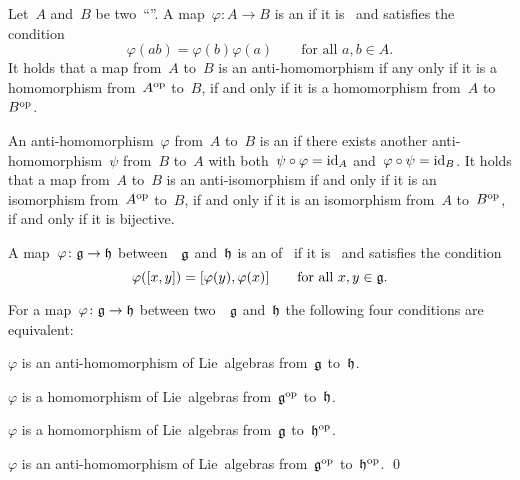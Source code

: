 \begin{recall}
  Let~$A$ and~$B$ be two~\enquote{\algebras{$\kf$}}.
  A map~$\varphi \colon A \to B$ is an  if it is~{\linear{$\kf$}} and satisfies the condition
  \[
    \varphi(ab)
    =
    \varphi(b) \varphi(a)
    \qquad
    \text{for all~$a, b \in A$.}
  \]
  It holds that a map from~$A$ to~$B$ is an anti-homomorphism if any only if it is a homomorphism from~$A^{\mathrm{op}}$ to~$B$, if and only if it is a homomorphism from~$A$ to~$B^{\mathrm{op}}$.

  An anti-homomorphism~$\varphi$ from~$A$ to~$B$ is an  if there exists another anti-homomorphism~$\psi$ from~$B$ to~$A$ with both~$\psi \circ \varphi = \mathrm{id}_A$ and~$\varphi \circ \psi = \mathrm{id}_B$.
  It holds that a map from~$A$ to~$B$ is an anti-isomorphism if and only if it is an isomorphism from~$A^{\mathrm{op}}$ to~$B$, if and only if it is an isomorphism from~$A$ to~$B^{\mathrm{op}}$, if and only if it is bijective.
\end{recall}


\begin{definition}
  A map~$\varphi \colon \glie \to \hlie$ between~{\liealgebras{$\kf$}}~$\mathfrak{g}$ and~$\mathfrak{h}$ is an  of~{\liealgebras{$\kf$}} if it is~{\linear{$\kf$}} and satisfies the condition
  \[
    \varphi([x,y]) = [\varphi(y), \varphi(x)]
    \qquad
    \text{for all~$x, y \in \mathfrak{g}$.}
  \]
\end{definition}


\begin{proposition}
  \label{antihomomorphisms correspond to opposite homomorphisms}
  For a map~$\varphi \colon \glie \to \hlie$ between two~{\liealgebras{$\kf$}}~$\mathfrak{g}$ and~$\mathfrak{h}$ the following four conditions are equivalent:
  \begin{equivalenceslist}
    \item
      $\varphi$ is an anti-homomorphism of Lie~algebras from~$\mathfrak{g}$ to~$\mathfrak{h}$.
    \item
      $\varphi$ is a homomorphism of Lie~algebras from~$\mathfrak{g}^{\mathrm{op}}$ to~$\mathfrak{h}$.
    \item
      $\varphi$ is a homomorphism of Lie~algebras from~$\mathfrak{g}$ to~$\mathfrak{h}^{\mathrm{op}}$.
    \item
      $\varphi$ is an anti-homomorphism of Lie~algebras from~$\mathfrak{g}^{\mathrm{op}}$ to~$\mathfrak{h}^{\mathrm{op}}$.
      \qed
  \end{equivalenceslist}
\end{proposition}


